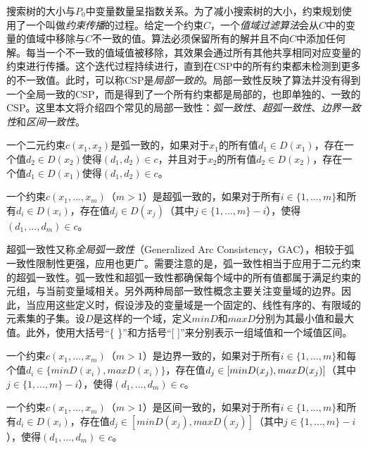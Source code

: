 搜索树的大小与$P_0$中变量数量呈指数关系。为了减小搜索树的大小，约束规划使用了一个叫做\textit{约束传播}的过程。给定一个约束$C$，一个\textit{值域过滤算法}会从$C$中的变量的值域中移除与$C$不一致的值。算法必须保留所有的解并且不向$C$中添加任何解。每当一个不一致的值域值被移除，其效果会通过所有其他共享相同对应变量的约束进行传播。这个迭代过程持续进行，直到在CSP中的所有约束都未检测到更多的不一致值。此时，可以称CSP是\textit{局部一致的}。局部一致性反映了算法并没有得到一个全局一致的CSP，而是得到了一个所有约束都是局部的，也即单独的、一致的CSP。这里本文将介绍四个常见的局部一致性：\textit{弧一致性}、\textit{超弧一致性}、\textit{边界一致性}和\textit{区间一致性}。

\begin{definition}
    一个二元约束$c(x_1, x_2)$是弧一致的，如果对于$x_1$的所有值$d_1 \in D(x_1)$，存在一个值$d_2 \in D(x_2)$使得$(d_1, d_2) \in c$，并且对于$x_2$的所有值$d_2 \in D(x_2)$，存在一个值$d_1 \in D(x_1)$使得$(d_1, d_2) \in c$。
\end{definition}

\begin{definition}
    一个约束$c(x_1, ..., x_m)$（$m>1$）是超弧一致的，如果对于所有$i \in \{1, ..., m\}$和所有$d_i \in D(x_i)$，存在值$d_j \in D(x_j)$（其中$j \in \{1, ..., m\} - i$），使得$(d_1, ..., d_m) \in c$。
\end{definition}

超弧一致性又称\textit{全局弧一致性}（Generalized Arc Consistency，GAC），相较于弧一致性限制性更强，应用也更广。需要注意的是，弧一致性相当于应用于二元约束的超弧一致性。弧一致性和超弧一致性都确保每个域中的所有值都属于满足约束的元组，与当前变量域相关。另外两种局部一致性概念主要关注变量域的边界。因此，当应用这些定义时，假设涉及的变量域是一个固定的、线性有序的、有限域的元素集的子集。设$D$是这样的一个域，定义$min D$和$max D$分别为其最小值和最大值。此外，使用大括号“\{ \}”和方括号“[ ]”来分别表示一组域值和一个域值区间。

\begin{definition}
    一个约束$c(x_1, ..., x_m)$（$m>1$）是边界一致的，如果对于所有$i \in \{1, ..., m\}$和每个值$d_i \in \{min D(x_i), max D(x_i)\}$，存在值$d_j \in [min D(x_j), \\ max D(x_j)]$（其中$j \in \{1, ..., m\} - i$），使得$(d_1, ..., d_m) \in c$。
\end{definition}

\begin{definition}
    一个约束$c(x_1, ..., x_m)$（$m>1$）是区间一致的，如果对于所有$i \in \{1, ..., m\}$和所有$d_i \in D(x_i)$，存在值$d_j \in [min D(x_j), max D(x_j)]$（其中$j \in \{1, ..., m\} - i$），使得$(d_1, ..., d_m) \in c$。
\end{definition}

